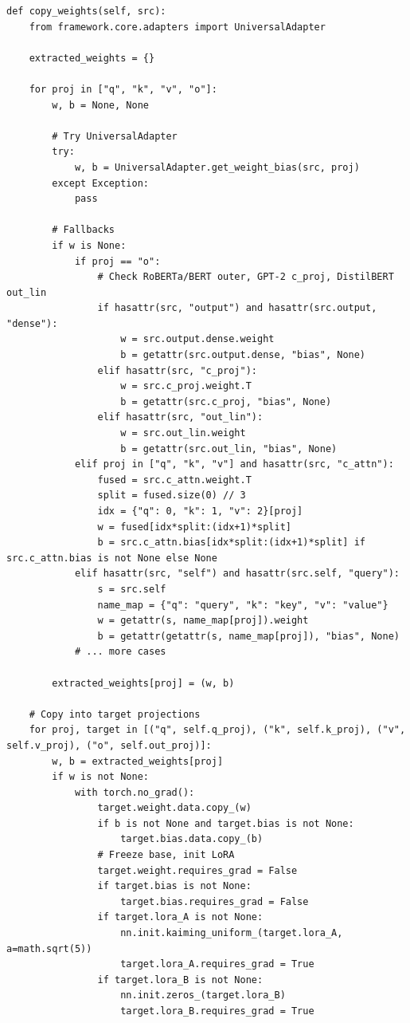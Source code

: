 \begin{lstlisting}
def copy_weights(self, src):
    from framework.core.adapters import UniversalAdapter
    
    extracted_weights = {}
    
    for proj in ["q", "k", "v", "o"]:
        w, b = None, None
        
        # Try UniversalAdapter
        try:
            w, b = UniversalAdapter.get_weight_bias(src, proj)
        except Exception:
            pass
        
        # Fallbacks
        if w is None:
            if proj == "o":
                # Check RoBERTa/BERT outer, GPT-2 c_proj, DistilBERT out_lin
                if hasattr(src, "output") and hasattr(src.output, "dense"):
                    w = src.output.dense.weight
                    b = getattr(src.output.dense, "bias", None)
                elif hasattr(src, "c_proj"):
                    w = src.c_proj.weight.T
                    b = getattr(src.c_proj, "bias", None)
                elif hasattr(src, "out_lin"):
                    w = src.out_lin.weight
                    b = getattr(src.out_lin, "bias", None)
            elif proj in ["q", "k", "v"] and hasattr(src, "c_attn"):
                fused = src.c_attn.weight.T
                split = fused.size(0) // 3
                idx = {"q": 0, "k": 1, "v": 2}[proj]
                w = fused[idx*split:(idx+1)*split]
                b = src.c_attn.bias[idx*split:(idx+1)*split] if src.c_attn.bias is not None else None
            elif hasattr(src, "self") and hasattr(src.self, "query"):
                s = src.self
                name_map = {"q": "query", "k": "key", "v": "value"}
                w = getattr(s, name_map[proj]).weight
                b = getattr(getattr(s, name_map[proj]), "bias", None)
            # ... more cases
        
        extracted_weights[proj] = (w, b)
    
    # Copy into target projections
    for proj, target in [("q", self.q_proj), ("k", self.k_proj), ("v", self.v_proj), ("o", self.out_proj)]:
        w, b = extracted_weights[proj]
        if w is not None:
            with torch.no_grad():
                target.weight.data.copy_(w)
                if b is not None and target.bias is not None:
                    target.bias.data.copy_(b)
                # Freeze base, init LoRA
                target.weight.requires_grad = False
                if target.bias is not None:
                    target.bias.requires_grad = False
                if target.lora_A is not None:
                    nn.init.kaiming_uniform_(target.lora_A, a=math.sqrt(5))
                    target.lora_A.requires_grad = True
                if target.lora_B is not None:
                    nn.init.zeros_(target.lora_B)
                    target.lora_B.requires_grad = True
\end{lstlisting}

